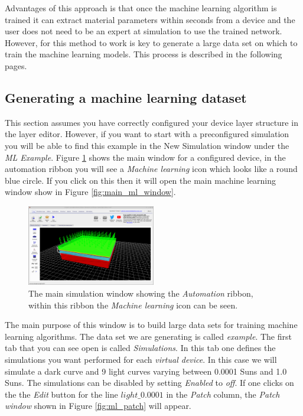 Advantages of this approach is that once the machine learning algorithm is trained it can extract material parameters within seconds from a device and the user does not need to be an expert at simulation to use the trained network.  However, for this method to work is key to generate a large data set on which to train the machine learning models. This process is described in the following pages.


\subsection{Generating a machine learning dataset}
This section assumes you have correctly configured your device layer structure in the layer editor. However, if you want to start with a preconfigured simulation you will be able to find this example in the New Simulation window under the \emph{ML Example}.  Figure \ref{fig:ml_main_window_device} shows the main window for a configured device, in the automation ribbon you will see a \emph{Machine learning} icon which looks like a round blue circle. If you click on this then it will open the main machine learning window show in Figure \ref{fig:main_ml_window}.

\begin{figure}
\centering
\includegraphics[width=0.5\textwidth,height=0.4\textwidth]{./images/ml/main_window.png}
\caption{The main simulation window showing the \emph{Automation} ribbon, within this ribbon the \emph{Machine learning} icon can be seen.}
\label{fig:ml_main_window_device}
\end{figure}

The main purpose of this window is to build large data sets for training machine learning algorithms. The data set we are generating is called \emph{example}.  The first tab that you can see open is called \emph{Simulations}. In this tab one defines the simulations you want performed for each \emph{virtual device}. In this case we will simulate a dark curve and 9 light curves varying between 0.0001 Suns and 1.0 Suns. The simulations can be disabled by setting \emph{Enabled} to \emph{off}.  If one clicks on the the \emph{Edit} button for the line $light\_0.0001$ in the \emph{Patch} column, the \emph{Patch window} shown in Figure \ref{fig:ml_patch} will appear. 

